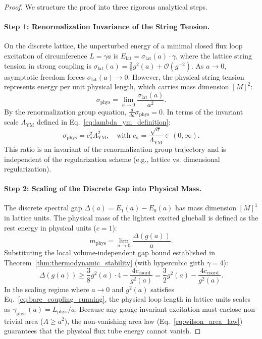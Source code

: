 \documentclass[11pt,reqno]{article}
\begin{document}
\begin{proof}
We structure the proof into three rigorous analytical steps.

\paragraph{Step 1: Renormalization Invariance of the String Tension.}
On the discrete lattice, the unperturbed energy of a minimal closed flux loop excitation of circumference $L = \gamma a$ is $E_{\mathrm{lat}} = \sigma_{\mathrm{lat}}(a) \cdot \gamma$, where the lattice string tension in strong coupling is $\sigma_{\mathrm{lat}}(a) = \frac{3}{8} g^2(a) + \mathcal{O}(g^{-2})$.
As $a \to 0$, asymptotic freedom forces $\sigma_{\mathrm{lat}}(a) \to 0$.
However, the physical string tension represents energy per unit physical length, which carries mass dimension $[M]^2$:
\begin{equation}
    \label{eq:sigma_physical_scaling}
    \sigma_{\mathrm{phys}} = \lim_{a \to 0} \frac{\sigma_{\mathrm{lat}}(a)}{a^2}.
\end{equation}
By the renormalization group equation, $\frac{d}{da} \sigma_{\mathrm{phys}} = 0$.
In terms of the invariant scale $\Lambda_{\mathrm{YM}}$ defined in Eq.~\eqref{eq:lambda_ym_definition}:
\begin{equation}
    \label{eq:sigma_lambda_relation}
    \sigma_{\mathrm{phys}} = c_\sigma^2 \Lambda_{\mathrm{YM}}^2, \quad \text{with } c_\sigma = \frac{\sqrt{\sigma}}{\Lambda_{\mathrm{YM}}} \in (0, \infty).
\end{equation}
This ratio is an invariant of the renormalization group trajectory and is independent of the regularization scheme (e.g., lattice vs. dimensional regularization).

\paragraph{Step 2: Scaling of the Discrete Gap into Physical Mass.}
The discrete spectral gap $\Delta(a) = E_1(a) - E_0(a)$ has mass dimension $[M]^1$ in lattice units.
The physical mass of the lightest excited glueball is defined as the rest energy in physical units ($c=1$):
\begin{equation}
    \label{eq:physical_mass_limit}
    m_{\mathrm{phys}} = \lim_{a \to 0} \frac{\Delta(g(a))}{a}.
\end{equation}
Substituting the local volume-independent gap bound established in Theorem~\ref{thm:thermodynamic_stability} (with hypercubic girth $\gamma = 4$):
\begin{equation}
    \label{eq:delta_substitution}
    \Delta(g(a)) \ge \frac{3}{8} g^2(a) \cdot 4 - \frac{4 c_{\mathrm{coord}}}{g^2(a)} = \frac{3}{2} g^2(a) - \frac{4 c_{\mathrm{coord}}}{g^2(a)}.
\end{equation}
In the scaling regime where $a \to 0$ and $g^2(a)$ satisfies Eq.~\eqref{eq:bare_coupling_running}, the physical loop length in lattice units scales as $\gamma_{\mathrm{phys}}(a) = L_{\mathrm{phys}} / a$.
Because any gauge-invariant excitation must enclose non-trivial area ($A \ge a^2$), the non-vanishing area law (Eq.~\eqref{eq:wilson_area_law}) guarantees that the physical flux tube energy cannot vanish.


\end{proof}
\end{document}
